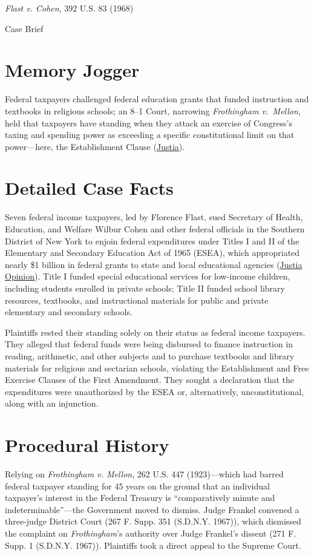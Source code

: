 \documentclass[12pt]{article}
\begin{document}
\begin{center}
{\LARGE \textit{Flast v. Cohen}, 392 U.S. 83 (1968)\par}
\vspace{0.8em}
{\large Case Brief\par}
\end{center}
\vspace{1em}

\section{Memory Jogger}
Federal taxpayers challenged federal education grants that funded instruction and textbooks in religious schools; an 8--1 Court, narrowing \textit{Frothingham v.\ Mellon}, held that taxpayers have standing when they attack an exercise of Congress's taxing and spending power as exceeding a specific constitutional limit on that power---here, the Establishment Clause (\href{https://supreme.justia.com/cases/federal/us/392/83/}{Justia}).

\section{Detailed Case Facts}
Seven federal income taxpayers, led by Florence Flast, sued Secretary of Health, Education, and Welfare Wilbur Cohen and other federal officials in the Southern District of New York to enjoin federal expenditures under Titles I and II of the Elementary and Secondary Education Act of 1965 (ESEA), which appropriated nearly \$1 billion in federal grants to state and local educational agencies (\href{https://supreme.justia.com/cases/federal/us/392/83/}{Justia Opinion}). Title I funded special educational services for low-income children, including students enrolled in private schools; Title II funded school library resources, textbooks, and instructional materials for public and private elementary and secondary schools.

Plaintiffs rested their standing solely on their status as federal income taxpayers. They alleged that federal funds were being disbursed to finance instruction in reading, arithmetic, and other subjects and to purchase textbooks and library materials for religious and sectarian schools, violating the Establishment and Free Exercise Clauses of the First Amendment. They sought a declaration that the expenditures were unauthorized by the ESEA or, alternatively, unconstitutional, along with an injunction.

\section{Procedural History}
Relying on \textit{Frothingham v. Mellon}, 262 U.S. 447 (1923)---which had barred federal taxpayer standing for 45 years on the ground that an individual taxpayer's interest in the Federal Treasury is ``comparatively minute and indeterminable''---the Government moved to dismiss. Judge Frankel convened a three-judge District Court (267 F. Supp. 351 (S.D.N.Y. 1967)), which dismissed the complaint on \textit{Frothingham}'s authority over Judge Frankel's dissent (271 F. Supp. 1 (S.D.N.Y. 1967)). Plaintiffs took a direct appeal to the Supreme Court.
\end{document}
